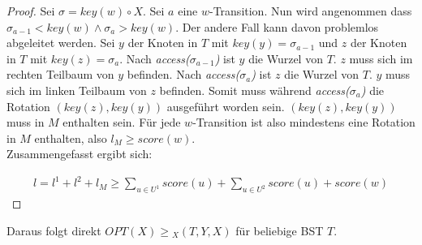 \documentclass[a4paper,12pt]{article}
\begin{document}
\begin{proof}
	Sei $\sigma = \mathit{key}(w) \circ X$. Sei $a$ eine $w$-Transition. Nun wird angenommen dass $\sigma_{a-1} < \mathit{key}(w)  \land \sigma_{a} > \mathit{key}(w)$. Der andere Fall kann davon problemlos abgeleitet werden. Sei $y$ der Knoten in $T$ mit $\mathit{key}(y) = \sigma_{a-1}$ und $z$ der Knoten in $T$ mit $\mathit{key}(z) = \sigma_{a}$. Nach \textit{access($\sigma_{a-1}$)} ist $y$ die Wurzel von $T$. $z$ muss sich im rechten Teilbaum von $y$ befinden. Nach  \textit{access($\sigma_{a}$)} ist $z$ die Wurzel von $T$. $y$ muss sich im linken Teilbaum von $z$ befinden. Somit muss während \textit{access($\sigma_{a}$)} die Rotation $(\mathit{key}(z),\mathit{key}(y))$ ausgeführt worden sein. $(\mathit{key}(z),\mathit{key}(y))$ muss in $M$ enthalten sein. Für jede $w$-Transition ist also mindestens eine Rotation in $M$ enthalten, also $l_M \geq  \mathit{score} \left(w\right)$.\\
	Zusammengefasst ergibt sich:
	
	\begin{align*}
	l = l^1 + l^2 + l_M \geq \sum_{u \in U^1} {\mathit{score}} (u) + \sum_{u \in U^2}{\mathit{score}} (u) +  {\mathit{score}} (w)
	\end{align*}
	
	
	
	
\end{proof}

\noindent Daraus folgt direkt $\mathit{OPT}\left(X\right) \geq {_X(T, Y, X)} $ für beliebige BST $T$.  
\end{document}
